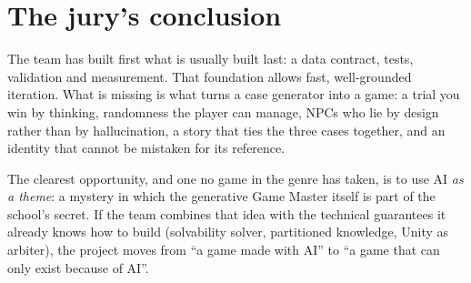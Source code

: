 \documentclass[11pt,a4paper]{article}
\begin{document}
\section{The jury's conclusion}

The team has built first what is usually built last: a data contract, tests, validation and
measurement. That foundation allows fast, well-grounded iteration. What is missing is what turns a
case generator into a game: a trial you win by thinking, randomness the player can manage, NPCs who
lie by design rather than by hallucination, a story that ties the three cases together, and an
identity that cannot be mistaken for its reference.

The clearest opportunity, and one no game in the genre has taken, is to use AI \emph{as a theme}: a
mystery in which the generative Game Master itself is part of the school's secret. If the team
combines that idea with the technical guarantees it already knows how to build (solvability solver,
partitioned knowledge, Unity as arbiter), the project moves from ``a game made with AI'' to ``a game
that can only exist because of AI''.
\end{document}

